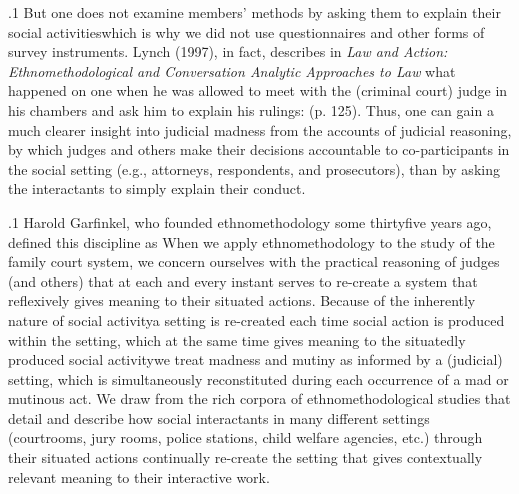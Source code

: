 \documentclass[11pt, twoside]{article}
\begin{document}
{\p.1{%
But one does not examine members’ methods by asking them to explain their social activities\mdash{}which is why we did not use questionnaires
and other forms of survey instruments. Lynch (1997), in fact, describes
in \textit{Law and Action: Ethnomethodological and
Conversation Analytic Approaches to Law} what
happened on one  when he was
allowed to meet with the (criminal court) judge in his chambers and ask
him to explain his rulings:  (p. 125). Thus, one
can gain a much clearer insight into judicial madness from the 
accounts of judicial reasoning, by which judges and others make their
decisions accountable to co-participants in the social setting (e.g., attorneys, respondents, and prosecutors), than by asking the interactants to
simply explain their conduct.
}%

\p.1{%
Harold Garfinkel, who founded ethnomethodology some thirtyfive
years ago, defined this discipline as 
When we apply ethnomethodology to the study of the family court
system, we concern ourselves with the practical reasoning of judges (and
others) that at each and every instant serves to re-create a system that
reflexively gives meaning to their situated actions. Because of the inherently  nature of social activity\mdash{}a setting is re-created each
time social action is produced within the setting, which at the same
time gives meaning to the situatedly produced social activity\mdash{}we treat
madness and mutiny as informed by a (judicial) setting, which is simultaneously reconstituted during each occurrence of a mad or mutinous
act. We draw from the rich corpora of ethnomethodological studies that
detail and describe how social interactants in many different settings
(courtrooms, jury rooms, police stations, child welfare agencies, etc.)
through their situated actions continually re-create the setting that gives
contextually relevant meaning to their interactive work.
}%

}
\end{document}
